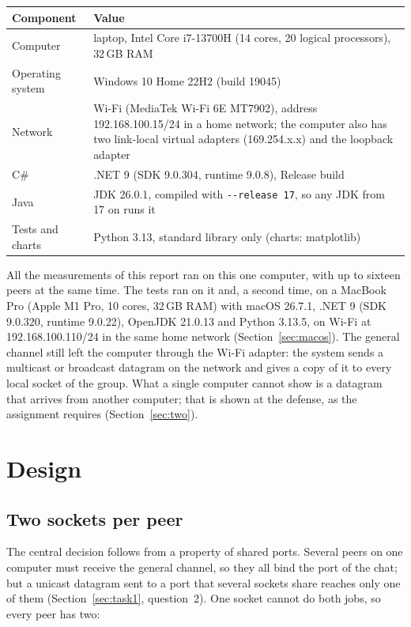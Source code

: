 \documentclass[11pt,a4paper]{article}
\newcommand{\code}[1]{{\frenchspacing\texttt{#1}}}
\begin{document}
\begin{center}
\small
\begin{tabularx}{\linewidth}{@{}lX@{}}
\toprule
Component & Value \\
\midrule
Computer & laptop, Intel Core i7-13700H (14 cores, 20 logical processors), 32\,GB RAM \\
Operating system & Windows 10 Home 22H2 (build 19045) \\
Network & Wi-Fi (MediaTek Wi-Fi 6E MT7902), address 192.168.100.15/24 in a home network;
  the computer also has two link-local virtual adapters (169.254.x.x) and the loopback adapter \\
C\# & .NET 9 (SDK 9.0.304, runtime 9.0.8), Release build \\
Java & JDK 26.0.1, compiled with \code{-{}-release 17}, so any JDK from 17 on runs it \\
Tests and charts & Python 3.13, standard library only (charts: matplotlib) \\
\bottomrule
\end{tabularx}
\end{center}

All the measurements of this report ran on this one computer, with up to sixteen peers
at the same time. The tests ran on it and, a second time, on a MacBook Pro (Apple M1 Pro, 10 cores,
32\,GB RAM) with macOS 26.7.1, .NET 9 (SDK 9.0.320, runtime 9.0.22), OpenJDK 21.0.13 and
Python 3.13.5, on Wi-Fi at 192.168.100.110/24 in the same home network (Section~\ref{sec:macos}). The general channel still left the computer through the Wi-Fi adapter: the system
sends a multicast or broadcast datagram on the network and gives a copy of it to every local socket
of the group. What a single computer cannot show is a datagram that arrives from another computer;
that is shown at the defense, as the assignment requires (Section~\ref{sec:two}).

\section{Design}

\subsection{Two sockets per peer}

The central decision follows from a property of shared ports. Several peers on one computer must
receive the general channel, so they all bind the port of the chat; but a unicast datagram sent to a
port that several sockets share reaches only one of them (Section~\ref{sec:task1}, question~2).
One socket cannot do both jobs, so every peer has two:
\end{document}
